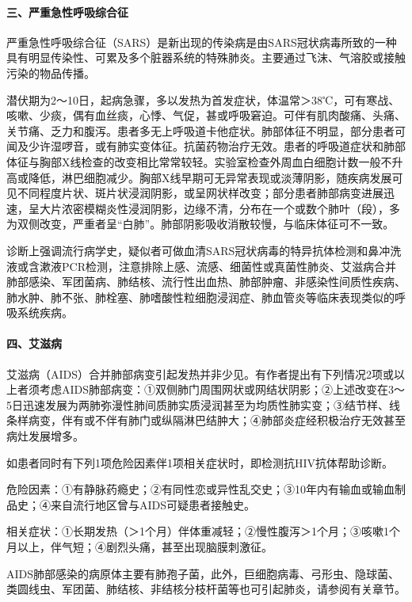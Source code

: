 \paragraph{三、严重急性呼吸综合征}

严重急性呼吸综合征（SARS）是新出现的传染病是由SARS冠状病毒所致的一种具有明显传染性、可累及多个脏器系统的特殊肺炎。主要通过飞沫、气溶胶或接触污染的物品传播。

潜伏期为2～10日，起病急骤，多以发热为首发症状，体温常＞38℃，可有寒战、咳嗽、少痰，偶有血丝痰，心悸、气促，甚或呼吸窘迫。可伴有肌肉酸痛、头痛、关节痛、乏力和腹泻。患者多无上呼吸道卡他症状。肺部体征不明显，部分患者可闻及少许湿啰音，或有肺实变体征。抗菌药物治疗无效。患者的呼吸道症状和肺部体征与胸部X线检查的改变相比常常较轻。实验室检查外周血白细胞计数一般不升高或降低，淋巴细胞减少。胸部X线早期可无异常表现或淡薄阴影，随疾病发展可见不同程度片状、斑片状浸润阴影，或呈网状样改变；部分患者肺部病变进展迅速，呈大片浓密模糊炎性浸润阴影，边缘不清，分布在一个或数个肺叶（段），多为双侧改变，严重者呈“白肺”。肺部阴影吸收消散较慢，与临床体征可不一致。

诊断上强调流行病学史，疑似者可做血清SARS冠状病毒的特异抗体检测和鼻冲洗液或含漱液PCR检测，注意排除上感、流感、细菌性或真菌性肺炎、艾滋病合并肺部感染、军团菌病、肺结核、流行性出血热、肺部肿瘤、非感染性间质性疾病、肺水肿、肺不张、肺栓塞、肺嗜酸性粒细胞浸润症、肺血管炎等临床表现类似的呼吸系统疾病。

\paragraph{四、艾滋病}

艾滋病（AIDS）合并肺部病变引起发热并非少见。有作者提出有下列情况2项或以上者须考虑AIDS肺部病变：①双侧肺门周围网状或网结状阴影；②上述改变在3～5日迅速发展为两肺弥漫性肺间质肺实质浸润甚至为均质性肺实变；③结节样、线条样病变，伴有或不伴有肺门或纵隔淋巴结肿大；④肺部炎症经积极治疗无效甚至病灶发展增多。

如患者同时有下列1项危险因素伴1项相关症状时，即检测抗HIV抗体帮助诊断。

危险因素：①有静脉药瘾史；②有同性恋或异性乱交史；③10年内有输血或输血制品史；④来自流行地区曾与AIDS可疑患者接触史。

相关症状：①长期发热（＞1个月）伴体重减轻；②慢性腹泻＞1个月；③咳嗽1个月以上，伴气短；④剧烈头痛，甚至出现脑膜刺激征。

AIDS肺部感染的病原体主要有肺孢子菌，此外，巨细胞病毒、弓形虫、隐球菌、类圆线虫、军团菌、肺结核、非结核分枝杆菌等也可引起肺炎，请参阅有关章节。

